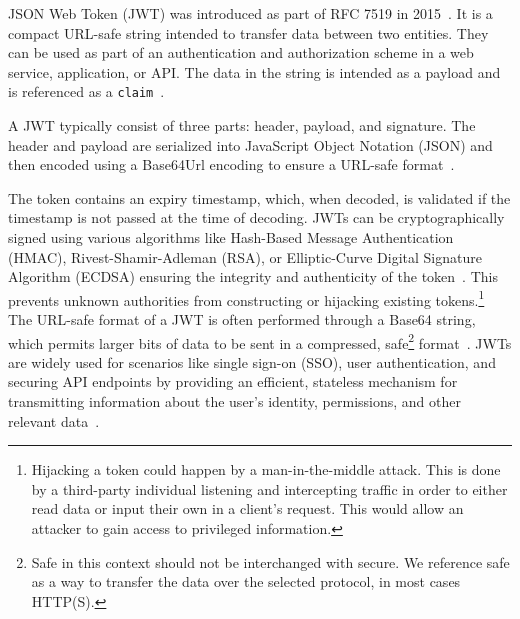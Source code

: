 
JSON Web Token (JWT) was introduced as part of RFC 7519 in 2015~\cite{RFC7519}.
It is a compact URL-safe string intended to transfer data between two entities.
They can be used as part of an authentication and authorization scheme in a web
service, application, or API\@.
The data in the string is intended as a payload and is referenced as a
\texttt{claim}~\cite{RFC7519}.

A JWT typically consist of three parts: header, payload, and signature.
The header and payload are serialized into JavaScript Object Notation (JSON)
and then encoded using a Base64Url encoding to ensure a URL-safe
format~\cite{RFC7519}.

The token contains an expiry timestamp, which, when decoded, is validated if
the timestamp is not passed at the time of decoding.
JWTs can be cryptographically signed using various algorithms like Hash-Based
Message Authentication (HMAC), Rivest-Shamir-Adleman (RSA), or
Elliptic-Curve Digital Signature Algorithm (ECDSA) ensuring the integrity and
authenticity of the token~\cite{RFC7519}.
This prevents unknown authorities from constructing or hijacking existing
tokens.\footnote{
  Hijacking a token could happen by a man-in-the-middle attack.
  This is done by a third-party individual listening and intercepting traffic
  in order to either read data or input their own in a client's request.
  This would allow an attacker to gain access to privileged information.
}
The URL-safe format of a JWT is often performed through a Base64 string, which
permits larger bits of data to be sent in a compressed, safe\footnote{
  Safe in this context should not be interchanged with secure.
  We reference safe as a way to transfer the data over the selected protocol,
  in most cases HTTP(S).
} format~\cite{RFC7519}.
JWTs are widely used for scenarios like single sign-on (SSO), user
authentication, and securing API endpoints by providing an efficient, stateless
mechanism for transmitting information about the user's identity, permissions,
and other relevant data~\cite{karande2018securingnode}.
